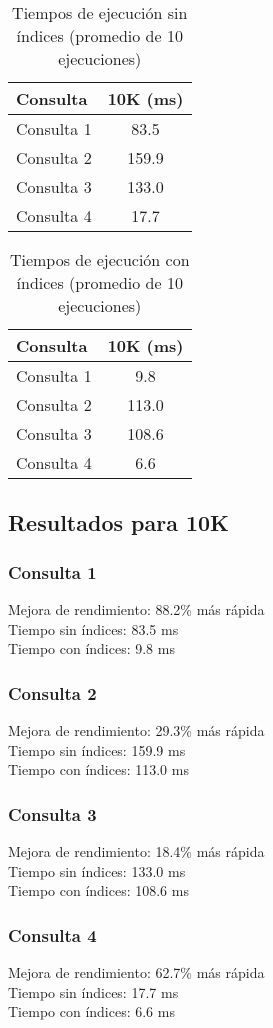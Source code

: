 

\begin{table}[h!]
\centering
\begin{tabular}{|l|c|}
\hline
\textbf{Consulta} & \textbf{10K (ms)} \\
\hline
Consulta 1 & 83.5 \\
Consulta 2 & 159.9 \\
Consulta 3 & 133.0 \\
Consulta 4 & 17.7 \\
\hline
\end{tabular}
\caption{Tiempos de ejecución sin índices (promedio de 10 ejecuciones)}
\label{table:sin_indices_10k}
\end{table}

\begin{table}[h!]
\centering
\begin{tabular}{|l|c|}
\hline
\textbf{Consulta} & \textbf{10K (ms)} \\
\hline
Consulta 1 & 9.8 \\
Consulta 2 & 113.0 \\
Consulta 3 & 108.6 \\
Consulta 4 & 6.6 \\
\hline
\end{tabular}
\caption{Tiempos de ejecución con índices (promedio de 10 ejecuciones)}
\label{table:con_indices_10k}
\end{table}

\subsection{Resultados para 10K}

\subsubsection{Consulta 1}
Mejora de rendimiento: 88.2\% más rápida\\
Tiempo sin índices: 83.5 ms\\
Tiempo con índices: 9.8 ms\\

\subsubsection{Consulta 2}
Mejora de rendimiento: 29.3\% más rápida\\
Tiempo sin índices: 159.9 ms\\
Tiempo con índices: 113.0 ms\\

\subsubsection{Consulta 3}
Mejora de rendimiento: 18.4\% más rápida\\
Tiempo sin índices: 133.0 ms\\
Tiempo con índices: 108.6 ms\\

\subsubsection{Consulta 4}
Mejora de rendimiento: 62.7\% más rápida\\
Tiempo sin índices: 17.7 ms\\
Tiempo con índices: 6.6 ms\\


